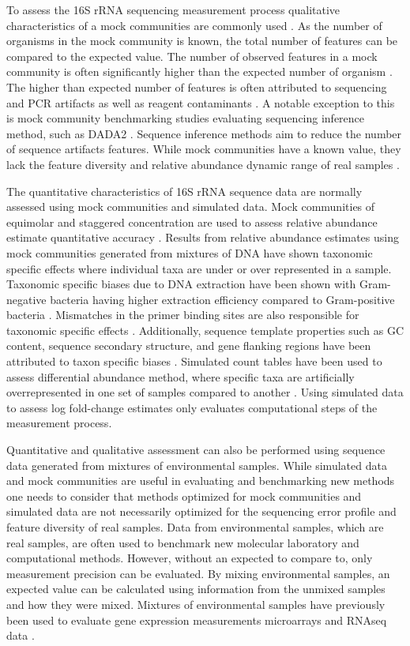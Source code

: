 \documentclass{bmcart}
\begin{document}
To assess the 16S rRNA sequencing measurement process qualitative
characteristics of a mock communities are commonly used
\cite{bokulich2016mockrobiota}. As the number of organisms in the
mock community is known, the total number of features can be compared to
the expected value. The number of observed features in a mock community
is often significantly higher than the expected number of organism
\cite{Kopylova2014}. The higher than expected number of features is
often attributed to sequencing and PCR artifacts as well as reagent
contaminants \cite{brooks2015truth,Huse2010}. A notable exception
to this is mock community benchmarking studies evaluating sequencing
inference method, such as DADA2 \cite{callahan2016dada2}. Sequence
inference methods aim to reduce the number of sequence artifacts
features. While mock communities have a known value, they lack the
feature diversity and relative abundance dynamic range of real samples
\cite{bokulich2016mockrobiota}.

The quantitative characteristics of 16S rRNA sequence data are normally
assessed using mock communities and simulated data. Mock communities of
equimolar and staggered concentration are used to assess relative
abundance estimate quantitative accuracy \cite{Kopylova2014}.
Results from relative abundance estimates using mock communities
generated from mixtures of DNA have shown taxonomic specific effects
where individual taxa are under or over represented in a sample.
Taxonomic specific biases due to DNA extraction have been shown with
Gram-negative bacteria having higher extraction efficiency compared to
Gram-positive bacteria \cite{Costea2017,Olson2012}. Mismatches in
the primer binding sites are also responsible for taxonomic specific
effects \cite{brooks2015truth,klindworth2012evaluation,Gohl2016}.
Additionally, sequence template properties such as GC content, sequence
secondary structure, and gene flanking regions have been attributed to
taxon specific biases \cite{Pinto2012,Hansen1998,Gohl2016}.
Simulated count tables have been used to assess differential abundance
method, where specific taxa are artificially overrepresented in one set
of samples compared to another \cite{McMurdie2014}. Using simulated
data to assess log fold-change estimates only evaluates computational
steps of the measurement process.

Quantitative and qualitative assessment can also be performed using
sequence data generated from mixtures of environmental samples. While
simulated data and mock communities are useful in evaluating and
benchmarking new methods one needs to consider that methods optimized
for mock communities and simulated data are not necessarily optimized
for the sequencing error profile and feature diversity of real samples.
Data from environmental samples, which are real samples, are often used
to benchmark new molecular laboratory and computational methods.
However, without an expected to compare to, only measurement precision
can be evaluated. By mixing environmental samples, an expected value can
be calculated using information from the unmixed samples and how they
were mixed. Mixtures of environmental samples have previously been used
to evaluate gene expression measurements microarrays and RNAseq data
\cite{parsons2015using,pine2011adaptable,thompson2005use}.
\end{document}

